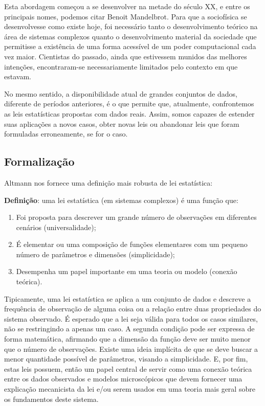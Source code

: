 Esta abordagem começou a se desenvolver na metade do século XX, e entre os principais nomes, podemos citar Benoit Mandelbrot. Para que a sociofísica se desenvolvesse como existe hoje, foi necessário tanto o desenvolvimento teórico na área de sistemas complexos quanto o desenvolvimento material da sociedade que permitisse a existência de uma forma acessível de um poder computacional cada vez maior. Cientistas do passado, ainda que estivessem munidos das melhores intenções, encontraram-se necessariamente limitados pelo contexto em que estavam. 

No mesmo sentido, a disponibilidade atual de grandes conjuntos de dados, diferente de períodos anteriores, é o que permite que, atualmente, confrontemos as leis estatísticas propostas com dados reais. Assim, somos capazes de estender suas aplicações a novos casos, obter novas leis ou abandonar leis que foram formuladas erroneamente, se for o caso. 


\subsection{Formalização}

Altmann nos fornece uma definição mais robusta de lei estatística\cite{Altmann_2024}:

\textbf{Definição}: uma lei estatística (em sistemas complexos) é uma função que:

\begin{enumerate} 
    \item Foi proposta para descrever um grande número de observações em diferentes cenários (universalidade); 
    \item  É elementar ou uma composição de funções elementares com um pequeno número de parâmetros e dimensões (simplicidade); 
    \item Desempenha um papel importante em uma teoria ou modelo (conexão teórica). 
\end{enumerate}

Tipicamente, uma lei estatística se aplica a um conjunto de dados e descreve a frequência de observação de alguma coisa ou a relação entre duas propriedades do sistema observado. É esperado que a lei seja válida para todos os casos similares, não se restringindo a apenas um caso. A segunda condição pode ser expressa de forma matemática, afirmando que a dimensão da função deve ser muito menor que o número de observações. Existe uma ideia implícita de que se deve buscar a menor quantidade possível de parâmetros, visando a simplicidade. E, por fim, estas leis possuem, então um papel central de servir como uma conexão teórica entre os dados observados e modelos microscópicos que devem fornecer uma explicação mecanicista da lei e/ou serem usados em uma teoria mais geral sobre os fundamentos deste sistema.

